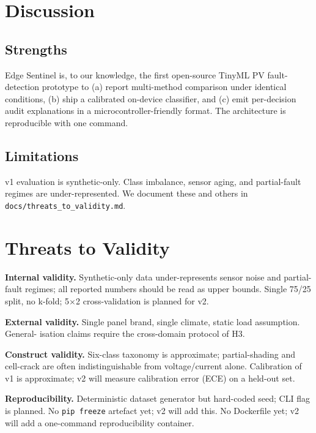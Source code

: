 \documentclass[12pt,journal,onecolumn]{IEEEtran}
\begin{document}
\section{Discussion}
\label{sec:discussion}

\subsection{Strengths}

Edge Sentinel is, to our knowledge, the first open-source TinyML PV
fault-detection prototype to (a) report multi-method comparison under
identical conditions, (b) ship a calibrated on-device classifier, and
(c) emit per-decision audit explanations in a microcontroller-friendly
format. The architecture is reproducible with one command.

\subsection{Limitations}

v1 evaluation is synthetic-only. Class imbalance, sensor aging, and
partial-fault regimes are under-represented. We document these and
others in \texttt{docs/threats\_to\_validity.md}.

\section{Threats to Validity}
\label{sec:threats}

\textbf{Internal validity.}
Synthetic-only data under-represents sensor noise and partial-fault
regimes; all reported numbers should be read as upper bounds. Single
75/25 split, no k-fold; 5$\times$2 cross-validation is planned for v2.

\textbf{External validity.}
Single panel brand, single climate, static load assumption. General-
isation claims require the cross-domain protocol of H3.

\textbf{Construct validity.}
Six-class taxonomy is approximate; partial-shading and cell-crack
are often indistinguishable from voltage/current alone. Calibration
of v1 is approximate; v2 will measure calibration error (ECE) on a
held-out set.

\textbf{Reproducibility.}
Deterministic dataset generator but hard-coded seed; CLI flag is
planned. No \texttt{pip freeze} artefact yet; v2 will add this. No
Dockerfile yet; v2 will add a one-command reproducibility container.
\end{document}
